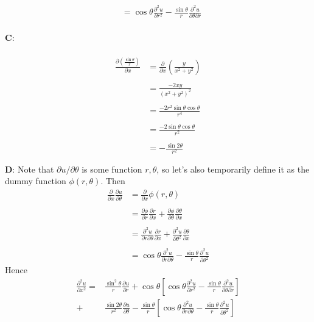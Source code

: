 \documentclass[12pt]{article}
\begin{document}
{\begin{align*}
 &= \cos \theta \frac{\partial^2 u}{\partial r^2} - \frac{\sin \theta}{r}  \frac{\partial^2 u}{\partial \theta \partial r} 
\end{align*} \\
\textbf{C}: \\ \\
\begin{align*}
 \frac{\partial (\frac{\sin \theta}{r})}{\partial x} &= \frac{\partial}{\partial x} \left( \frac{y}{x^2 + y^2} \right) \\ \\
 &= \frac{-2xy}{(x^2 + y^2)^2} \\ \\ 
 &= \frac{-2r^2 \sin \theta \cos \theta}{r^4} \\ \\
 &= \frac{-2 \sin \theta \cos \theta}{r^2} \\ \\
 &= -\frac{\sin 2 \theta}{r^2} \\ \\
\end{align*}
\textbf{D}: Note that $\partial u / \partial \theta$ is some function $r, \theta$, so let's also temporarily define it as the dummy function $\phi(r, \theta)$. Then
\begin{align*}
\frac{\partial }{\partial x}\frac{\partial u}{\partial \theta} &= \frac{\partial }{\partial x} \phi(r, \theta) \\ \\
&= \frac{\partial \phi}{\partial r} \frac{\partial r}{\partial x} + \frac{\partial \phi}{\partial \theta} \frac{\partial \theta}{\partial x} \\ \\
&= \frac{\partial^2 u}{\partial r \partial \theta} \frac{\partial r}{\partial x} + \frac{\partial^2 u}{\partial \theta^2} \frac{\partial \theta}{\partial x} \\ \\
&= \cos \theta \frac{\partial^2 u}{\partial r \partial \theta} - \frac{\sin \theta}{r}  \frac{\partial^2 u}{\partial \theta^2}
\end{align*}
Hence \\
\begin{align*}
\frac{\partial^2 u}{\partial x^2} =& \frac{\sin^2 \theta}{r} \frac{\partial u}{\partial r} + \cos \theta \left[ \cos \theta \frac{\partial^2 u}{\partial r^2} - \frac{\sin \theta}{r} \frac{\partial^2 u}{\partial \theta \partial r} \right] \\
+&  \frac{\sin 2\theta}{r^2} \frac{\partial u}{\partial \theta} - \frac{\sin \theta}{r} \left[ \cos \theta \frac{\partial^2 u}{\partial r \partial \theta} - \frac{\sin \theta}{r} \frac{\partial^2 u}{\partial \theta^2}\right]

\end{align*}}
\end{document}
